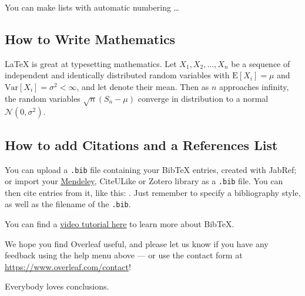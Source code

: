 \documentclass[a4paper]{article}
\begin{document}
You can make lists with automatic numbering \dots


\subsection{How to Write Mathematics}

\LaTeX{} is great at typesetting mathematics. Let $X_1, X_2, \ldots, X_n$ be a sequence of independent and identically distributed random variables with
$\text{E}[X_i] = \mu$ and $\text{Var}[X_i] = \sigma^2 < \infty$, and let denote their mean. Then as $n$ approaches infinity, the random variables $\sqrt{n}(S_n - \mu)$ converge in distribution to a normal $\mathcal{N}(0, \sigma^2)$.

\subsection{How to add Citations and a References List}

You can upload a \verb|.bib| file containing your BibTeX entries, created with JabRef; or import your \href{https://www.overleaf.com/blog/184}{Mendeley}, CiteULike or Zotero library as a \verb|.bib| file. You can then cite entries from it, like this: . Just remember to specify a bibliography style, as well as the filename of the \verb|.bib|.

You can find a \href{https://www.overleaf.com/help/97-how-to-include-a-bibliography-using-bibtex}{video tutorial here} to learn more about BibTeX.

We hope you find Overleaf useful, and please let us know if you have any feedback using the help menu above --- or use the contact form at \url{https://www.overleaf.com/contact}!


Everybody loves conclusions.


%
%
\end{document}
